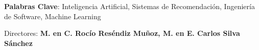 \begin{titlepage}
    \textbf{Palabras Clave}:  Inteligencia Artificial, Sistemas de Recomendación, Ingeniería de Software, Machine Learning

    \vspace{1.5cm}
     
    \begin{center}


    Directores: \linebreak
    \textbf{ M. en C. Roc\'io Res\'endiz Muñoz, M. en E. Carlos Silva S\'anchez}

    \end{center}
\end{titlepage}
